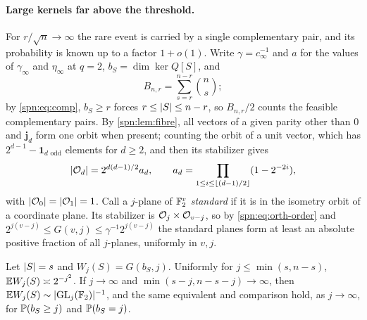 \paragraph{Large kernels far above the threshold.}
For $r/\sqrt n\to\infty$ the rare event is carried by a single complementary pair, and its
probability is known up to a factor $1+o(1)$. Write $\gamma=c_\infty^{-1}$ and $a$ for the values of $\gamma_\infty$ and $\eta_\infty$ at $q=2$,
$b_S=\dim\ker Q[S]$, and
\[
 B_{n,r}=\sum_{s=r}^{n-r}\binom ns ;
\]
by \eqref{spn:eq:comp}, $b_S\ge r$ forces $r\le\lvert S\rvert\le n-r$, so $B_{n,r}/2$ counts the feasible
complementary pairs. By \cref{spn:lem:fibre}, all vectors of a given parity other than $0$ and
$\mathbf j_d$ form one orbit when present; counting the orbit of a unit vector, which has
$2^{d-1}-\mathbf 1_{d\text{ odd}}$ elements for $d\ge2$, and then its stabilizer gives
\begin{equation}\label{spn:eq:orth-order}
 \lvert\mathcal{O}_d\rvert=2^{d(d-1)/2}a_d,\qquad a_d=\prod_{1\le i\le\lfloor(d-1)/2\rfloor}(1-2^{-2i}),
\end{equation}
with $\lvert\mathcal{O}_0\rvert=\lvert\mathcal{O}_1\rvert=1$. Call a $j$-plane of $\mathbb{F}_2^v$ \emph{standard} if it is
in the isometry orbit of a coordinate plane. Its stabilizer is $\mathcal{O}_j\times\mathcal{O}_{v-j}$,
so by \eqref{spn:eq:orth-order} and $2^{j(v-j)}\le G(v,j)\le\gamma^{-1}2^{j(v-j)}$ the standard
planes form at least an absolute positive fraction of all $j$-planes, uniformly in $v,j$.

\begin{lemma}\label{spn:lem:onesupport}
Let $\lvert S\rvert=s$ and $W_j(S)=G(b_S,j)$. Uniformly for $j\le\min(s,n-s)$,
$\mathbb{E} W_j(S)\asymp2^{-j^2}$. If $j\to\infty$ and $\min(s-j,n-s-j)\to\infty$, then
$\mathbb{E} W_j(S)\sim\lvert\operatorname{GL}_j(\mathbb{F}_2)\rvert^{-1}$, and the same equivalent and comparison hold, as
$j\to\infty$, for $\mathbb{P}(b_S\ge j)$ and $\mathbb{P}(b_S=j)$.
\end{lemma}

